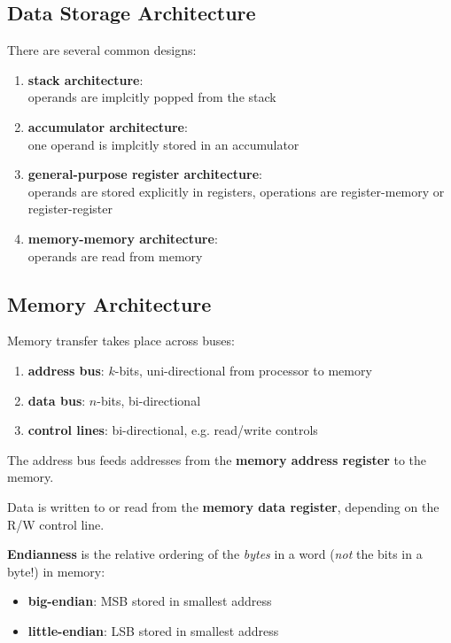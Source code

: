 \subsection{Data Storage Architecture}
There are several common designs:

\begin{enumerate}[itemsep=0.5em]
    \item \textbf{stack architecture}: \\ operands are implcitly popped from the stack
    \item \textbf{accumulator architecture}: \\ one operand is implcitly stored in an accumulator
    \item \textbf{general-purpose register architecture}: \\ operands are stored explicitly in registers, operations are register-memory or register-register
    \item \textbf{memory-memory architecture}: \\ operands are read from memory
\end{enumerate}

\subsection{Memory Architecture}
Memory transfer takes place across buses:

\begin{enumerate}
    \item \textbf{address bus}: $k$-bits, uni-directional from processor to memory
    \item \textbf{data bus}: $n$-bits, bi-directional
    \item \textbf{control lines}: bi-directional, e.g. read/write controls
\end{enumerate}

The address bus feeds addresses from the \textbf{memory address register} to the memory.

Data is written to or read from the \textbf{memory data register}, depending on the R/W control line.

\textbf{Endianness} is the relative ordering of the \textit{bytes} in a word (\textit{not} the bits in a byte!) in memory:

\begin{itemize}
    \item \textbf{big-endian}: MSB stored in smallest address
    \item \textbf{little-endian}: LSB stored in smallest address
\end{itemize}